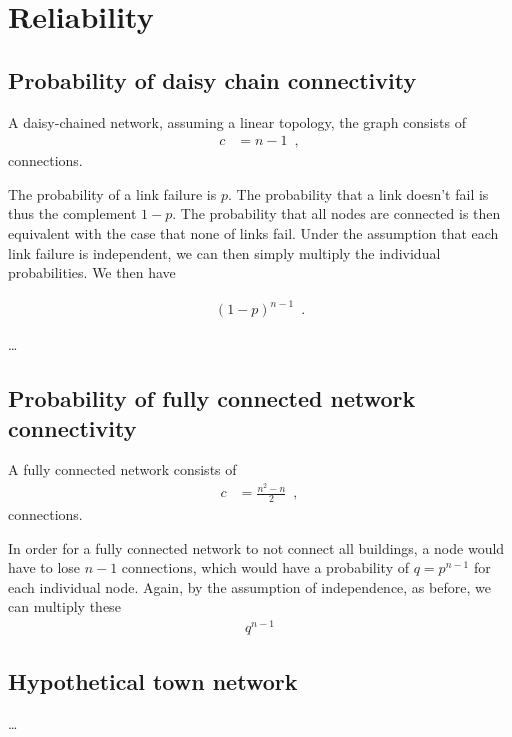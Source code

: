 
\section{Reliability}

\subsection{Probability of daisy chain connectivity}
A daisy-chained network, assuming a linear topology, the graph consists of
\begin{align}
    c &= n - 1 \enspace ,
\end{align}
connections.

The probability of a link failure is $p$. The probability that a link doesn't
fail is thus the complement $1 - p$. The probability that all nodes are connected
is then equivalent with the case that none of links fail. Under the assumption
that each link failure is independent, we can then simply multiply the individual
probabilities. We then have

\begin{align}
    (1 - p)^{n-1} \enspace .
\end{align}

\dots

\subsection{Probability of fully connected network connectivity}
A fully connected network consists of
\begin{align}
    c &= \frac{n^2 - n}{2} \enspace ,
\end{align}
connections.

In order for a fully connected network to not connect all buildings, a node
would have to lose $n-1$ connections, which would have a probability of
$q = p^{n-1}$ for each individual node. Again, by the assumption of independence,
as before, we can multiply these
\begin{align}
    q^{n-1}
\end{align}

\subsection{Hypothetical town network}
\dots

